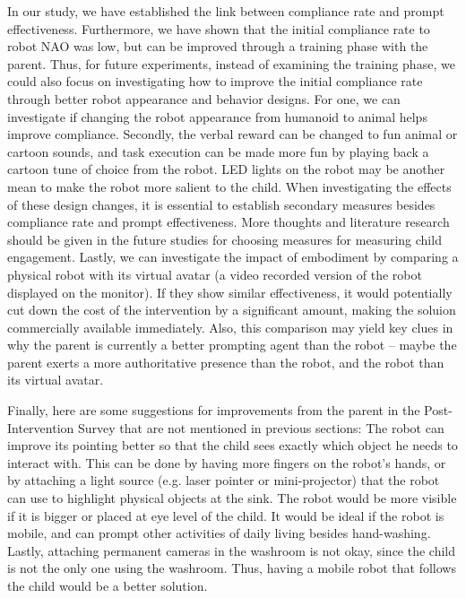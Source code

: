 In our study, we have established the link between compliance rate and prompt effectiveness.  Furthermore, we have shown that the initial compliance rate to robot NAO was low, but can be improved through a training phase with the parent.  Thus, for future experiments, instead of examining the training phase, we could also focus on investigating how to improve the initial compliance rate through better robot appearance and behavior designs.  For one, we can investigate if changing the robot appearance from humanoid to animal helps improve compliance.  Secondly, the verbal reward can be changed to fun animal or cartoon sounds, and task execution can be made more fun by playing back a cartoon tune of choice from the robot.  LED lights on the robot may be another mean to make the robot more salient to the child.  When investigating the effects of these design changes, it is essential to establish secondary measures besides compliance rate and prompt effectiveness.  More thoughts and literature research should be given in the future studies for choosing measures for measuring child engagement.  Lastly, we can investigate the impact of embodiment by comparing a physical robot with its virtual avatar (a video recorded version of the robot displayed on the monitor).  If they show similar effectiveness, it would potentially cut down the cost of the intervention by a significant amount, making the soluion commercially available immediately.  Also, this comparison may yield key clues in why the parent is currently a better prompting agent than the robot -- maybe the parent exerts a more authoritative presence than the robot, and the robot than its virtual avatar.

Finally, here are some suggestions for improvements from the parent in the Post-Intervention Survey that are not mentioned in previous sections:  The robot can improve its pointing better so that the child sees exactly which object he needs to interact with.  This can be done by having more fingers on the robot's hands, or by attaching a light source (e.g. laser pointer or mini-projector) that the robot can use to highlight physical objects at the sink.  The robot would be more visible if it is bigger or placed at eye level of the child.  It would be ideal if the robot is mobile, and can prompt other activities of daily living besides hand-washing.  Lastly, attaching permanent cameras in the washroom is not okay, since the child is not the only one using the washroom.  Thus, having a mobile robot that follows the child would be a better solution.
